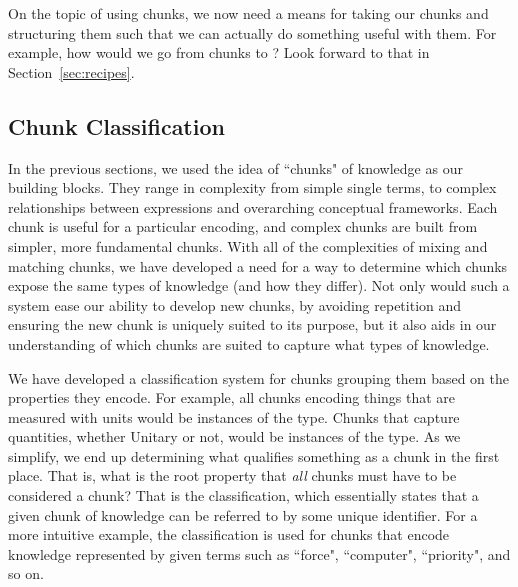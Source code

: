 On the topic of using chunks, we now need a means for taking our chunks and 
structuring them such that we can actually do something useful with them. For 
example, how would we go from chunks to \sfs{}? Look forward to that in 
Section~\ref{sec:recipes}.

\subsection{Chunk Classification}


In the previous sections, we used the idea of ``chunks" of knowledge as our 
building blocks. They range in complexity from simple single terms, to complex 
relationships between expressions and overarching conceptual frameworks. Each 
chunk is useful for a particular encoding, and complex chunks are built from 
simpler, more fundamental chunks. With all of the complexities of mixing and 
matching chunks, we have developed a need for a way to determine which chunks 
expose the same types of knowledge (and how they differ). Not only would such a 
system ease our ability to develop new chunks, by avoiding repetition and 
ensuring the new chunk is uniquely suited to its purpose, but it 
also aids in our understanding of which chunks are suited to capture what types 
of knowledge.

We have developed a classification system for chunks grouping them based on 
the properties they encode. For example, all chunks encoding things that are 
measured with units would be instances of the  type. Chunks that 
capture quantities, whether Unitary or not, 
would be instances of the  type. As we simplify, we end up 
determining what qualifies something as a chunk in the first place. That is, 
what is the root property that \emph{all} chunks must have to be considered a 
chunk? That is the  classification, which essentially states that 
a given chunk of knowledge can be referred to by some unique identifier. For a 
more intuitive example, the  classification is used 
for chunks that encode knowledge represented by given terms such as ``force", 
``computer", ``priority", and so on.

